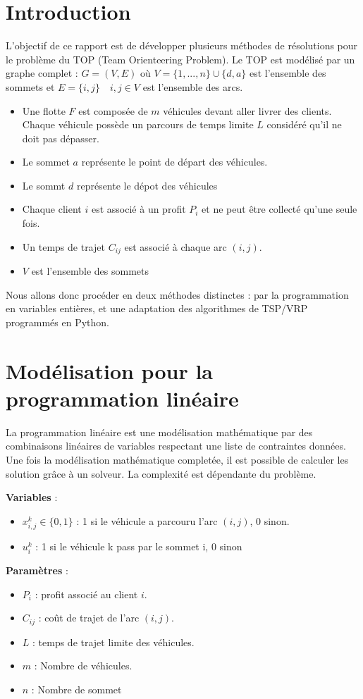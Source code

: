 \documentclass[a4paper, 12pt, DIV=12]{scrartcl}
\begin{document}
\section{Introduction}
    L'objectif de ce rapport est de développer plusieurs méthodes de résolutions pour le problème du TOP (Team Orienteering Problem). Le TOP est modélisé par un graphe complet :  $G = (V,E)$ où $V = \{1,...,n\} \cup \{d,a\} $ est l'ensemble des sommets et $E = \{i,j\} \quad i,j \in V $ est l'ensemble des arcs.\\
    \begin{itemize}
        \item Une flotte ${F}$ est composée de $m$ véhicules devant aller livrer des clients. Chaque véhicule possède un parcours de temps limite ${L}$ considéré qu'il ne doit pas dépasser.
        \item Le sommet $a$  représente le point de départ des véhicules.
        \item Le sommt $d$   représente le dépot des véhicules
        \item Chaque client $i$ est associé à un profit  $P_i$ et ne peut être collecté qu'une seule fois.
        \item Un temps de trajet $C_{ij}$ est associé à chaque arc $(i,j)$.
        \item $V$ est l'ensemble des sommets
    \end{itemize}
Nous allons donc procéder en deux méthodes distinctes : par la programmation en variables entières, et une adaptation  des algorithmes de TSP/VRP programmés en Python.      

\section{Modélisation pour la programmation linéaire}

La programmation linéaire est une modélisation mathématique par des combinaisons linéaires de variables respectant une liste de contraintes données. Une fois la modélisation mathématique completée, il est possible de calculer les solution grâce à un solveur.
La complexité est dépendante du problème. 

\textbf{Variables} : 
\begin{itemize}
    \item $x^k_{i,j} \in \{0,1\}$ : 1 si le véhicule a parcouru l'arc $(i,j)$, 0 sinon.
    \item $u^k_i$ : 1 si le véhicule k pass par le sommet i, 0 sinon
\end{itemize} 
\textbf{Paramètres} : 
\begin{itemize}
    \item $P_i$ : profit associé au client $i$.
    \item $C_{ij}$ : coût de trajet de l'arc $(i,j)$.
    \item $L$ : temps de trajet limite des véhicules.
    \item $m$ : Nombre de véhicules.
    \item $n$ : Nombre de sommet
\end{itemize}
\end{document}
